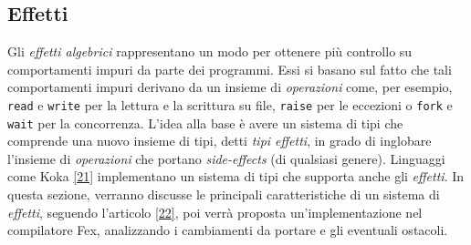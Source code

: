 \documentclass[10pt,a4paper]{article}
\begin{document}
\hypertarget{Effetti}{\subsection{Effetti}}
Gli \textit{effetti algebrici} rappresentano un modo per ottenere più controllo su comportamenti impuri da parte dei
programmi. Essi si basano sul fatto che tali comportamenti impuri derivano da un insieme di \textit{operazioni} come,
per esempio, \texttt{read} e \texttt{write} per la lettura e la scrittura su file, \texttt{raise} per le eccezioni o
\texttt{fork} e \texttt{wait} per la concorrenza.
L'idea alla base è avere un sistema di tipi che comprende una nuovo insieme di tipi, detti \textit{tipi effetti}, in
grado di inglobare l'insieme di \textit{operazioni} che portano \textit{side-effects} (di qualsiasi genere). Linguaggi
come Koka \hyperlink{bibl21}{[21]} implementano un sistema di tipi che supporta anche gli \textit{effetti}. In questa
sezione, verranno
discusse le principali caratteristiche di un sistema di \textit{effetti}, seguendo l'articolo \hyperlink{bibl22}{[22]},
poi verrà proposta un'implementazione nel compilatore Fex, analizzando i cambiamenti da portare e gli eventuali ostacoli.
\end{document}
